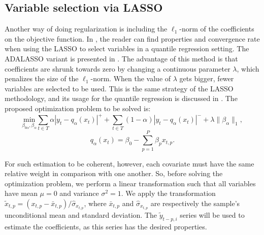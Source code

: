 \subsection{Variable selection via LASSO}
\label{sec:best-subset-ell1}

Another way of doing regularization is including the $\ell_1$-norm of the coefficients on the objective function. In \cite{belloni_l1-penalized_2009}, the reader can find properties and convergence rate when using the LASSO to select variables in a quantile regression setting. The ADALASSO variant is presented in \cite{ciuperca_adaptive_2016}. 
The advantage of this method is that coefficients are shrunk towards zero by changing a continuous parameter $\lambda$, which penalizes the size of the $\ell_1$-norm.  
When the value of $\lambda$ gets bigger, fewer variables are selected to be used. 
This is the same strategy of the LASSO methodology, and its usage for the quantile regression is discussed in \cite{li2012l1}.
The proposed optimization problem to be solved is:
\begin{equation}
\underset{\beta_{0\alpha},\beta_\alpha}{\text{min}} \sum_{t \in T}\alpha|y_{t}-q_\alpha(x_t)|^{+}+ \sum_{t \in T}(1-\alpha)|y_{t}-q_\alpha(x_t)|^{-}+\lambda\|\beta_\alpha\|_{1},
\label{eq:l1-qar-optim}
\end{equation}
\[
q_\alpha(x_t)=\beta_{0}-\sum_{p=1}^{P}\beta_{p}x_{t,p}.
\]

For such estimation to be coherent, however, each covariate must have the same relative weight in comparison with one another. 
So, before solving the optimization problem, we perform a linear transformation such that all variables have mean $\mu = 0$ and variance $\sigma^2 = 1$. 
We apply the transformation $\tilde{x}_{t,p} = (x_{t,p} - \bar{x}_{t,p}) / \hat\sigma_{x_{t,p}}$, where $\bar{x}_{t,p}$ and $\hat{\sigma}_{x_{t,p}}$ are respectively the sample's unconditional mean and standard deviation. The $\tilde{y}_{t-p,i}$ series will be used to estimate the coefficients, as this series has the desired properties. 

